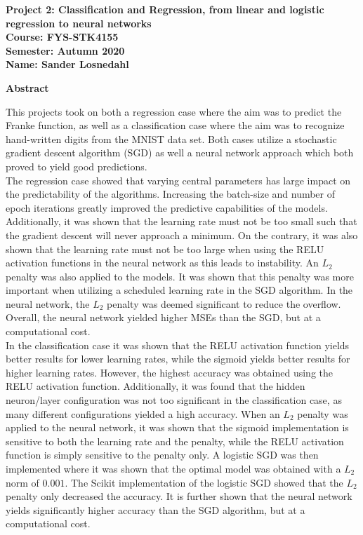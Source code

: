 \documentclass[12pt,a4paper]{article}
\begin{document}
\begin{center}
\LARGE{\textbf{Project 2: Classification and Regression, from linear and logistic regression to neural networks}}
\\
\large{\textbf{Course: FYS-STK4155}}
\\
\large{\textbf{Semester: Autumn 2020}}
\\
\large{\textbf{Name: Sander Losnedahl}}
\end{center}

\begin{center}
\Large{\textbf{Abstract}}
\end{center}

\noindent This projects took on both a regression case where the aim was to predict the Franke function, as well as a classification case where the aim was to recognize hand-written digits from the MNIST data set. Both cases utilize a stochastic gradient descent algorithm (SGD) as well a neural network approach which both proved to yield good predictions.
\\
The regression case showed that varying central parameters has large impact on the predictability of the algorithms. Increasing the batch-size and number of epoch iterations greatly improved the predictive capabilities of the models. Additionally, it was shown that the learning rate must not be too small such that the gradient descent will never approach a minimum. On the contrary, it was also shown that the learning rate must not be too large when using the RELU activation functions in the neural network as this leads to instability. An $L_2$ penalty was also applied to the models. It was shown that this penalty was more important when utilizing a scheduled learning rate in the SGD algorithm. In the neural network, the $L_2$ penalty was deemed significant to reduce the overflow. Overall, the neural network yielded higher MSEs than the SGD, but at a computational cost. 
\\
In the classification case it was shown that the RELU activation function yields better results for lower learning rates, while the sigmoid yields better results for higher learning rates. However, the highest accuracy was obtained using the RELU activation function. Additionally, it was found that the hidden neuron/layer configuration was not too significant in the classification case, as many different configurations yielded a high accuracy. When an $L_2$ penalty was applied to the neural network, it was shown that the sigmoid implementation is sensitive to both the learning rate and the penalty, while the RELU activation function is simply sensitive to the penalty only. A logistic SGD was then implemented where it was shown that the optimal model was obtained with a $L_2$ norm of $0.001$. The Scikit implementation of the logistic SGD showed that the $L_2$ penalty only decreased the accuracy. It is further shown that the neural network yields significantly higher accuracy than the SGD algorithm, but at a computational cost.
\end{document}
